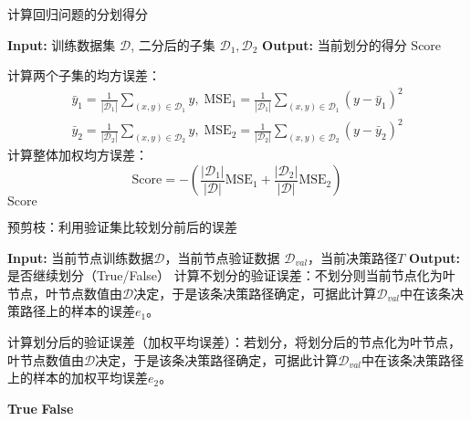 \begin{algorithm}
	\caption{计算回归问题的分划得分}
	\begin{algorithmic}[1]
		\State \textbf{Input:} 训练数据集 \(\mathcal{D}\), 二分后的子集 \(\mathcal{D}_1, \mathcal{D}_{2}\)
		\State \textbf{Output:} 当前划分的得分 \(\text{Score}\)
		
		\State 计算两个子集的均方误差：
		\begin{gather*}
			\bar{y}_1=\frac{1}{|\mathcal{D}_1|}\sum_{(x,y)\in\mathcal{D}_1}y,\;\text{MSE}_{1} = \frac{1}{|\mathcal{D}_{1}|} \sum_{(x,y) \in \mathcal{D}_{1}} (y - \bar{y}_{1})^2 \\
			\bar{y}_2=\frac{1}{|\mathcal{D}_2|}\sum_{(x,y)\in\mathcal{D}_2}y,\;\text{MSE}_{2} = \frac{1}{|\mathcal{D}_{2}|} \sum_{(x,y) \in \mathcal{D}_{2}} (y - \bar{y}_{2})^2
		\end{gather*}
		\State 计算整体加权均方误差：
		\begin{equation*}
			\text{Score} = - \left( \frac{|\mathcal{D}_{1}|}{|\mathcal{D}|} \text{MSE}_{1} + \frac{|\mathcal{D}_{2}|}{|\mathcal{D}|} \text{MSE}_{2} \right)
		\end{equation*}
		\State \Return \(\text{Score}\)
		\EndFunction
	\end{algorithmic}
\end{algorithm}

\begin{algorithm}
	\caption{预剪枝：利用验证集比较划分前后的误差}
	\begin{algorithmic}[1]
		\State \textbf{Input:} 当前节点训练数据$\mathcal{D}$，当前节点验证数据 \(\mathcal{D}_{val}\)，当前决策路径$T$
		\State \textbf{Output:} 是否继续划分（True/False）
		\State 计算不划分的验证误差：不划分则当前节点化为叶节点，叶节点数值由$\mathcal{D}$决定，于是该条决策路径确定，可据此计算$\mathcal{D}_{val}$中在该条决策路径上的样本的误差$e_1$。
		
		\State 计算划分后的验证误差（加权平均误差）：若划分，将划分后的节点化为叶节点，叶节点数值由$\mathcal{D}$决定，于是该条决策路径确定，可据此计算$\mathcal{D}_{val}$中在该条决策路径上的样本的加权平均误差$e_2$。
		
		\State \Return \textbf{True} 
		\Else
		\State \Return \textbf{False} 
		\EndIf
		\EndFunction
	\end{algorithmic}
\end{algorithm}

